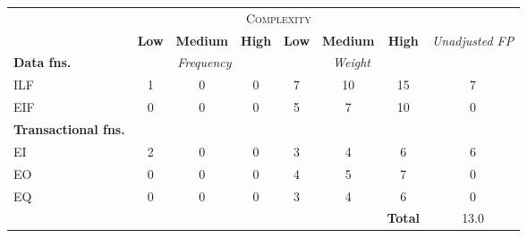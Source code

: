 
\begin{tabular}{|l|c|c|c|c|c|c|c|}
\cline{2-7}
\multicolumn{1}{c}{} & \multicolumn{6}{|c|}{\textsc{Complexity}} & \multicolumn{1}{c}{}  \\ \cline{2-8}
\multicolumn{1}{c|}{} & \textbf{Low} & \textbf{Medium} & \textbf{High} & \textbf{Low} & \textbf{Medium} & \textbf{High} & \multirow{2}{*}{\textit{Unadjusted FP}} \\ \cline{1-7}
\textbf{Data fns.} & \multicolumn{3}{|c|}{\textit{Frequency}} &  \multicolumn{3}{|c|}{\textit{Weight}} & \\ \hline
ILF 	& 1 & 0 & 0 & 7 & 10 & 15 & 7 	\\ \hline
EIF 	& 0 & 0 & 0 & 5 & 7 & 10 & 0		\\ \hline
\textbf{Transactional fns.} & \multicolumn{7}{|c|}{} \\ \hline
EI 		& 2 & 0 & 0 & 3 & 4 & 6 & 6		\\ \hline
EO 		& 0 & 0 & 0 & 4 & 5 & 7 & 0		\\ \hline
EQ		& 0 & 0 & 0 & 3 & 4 & 6 & 0		\\ \hline
\multicolumn{6}{c|}{} & \textbf{Total} & 13.0 \\ \cline{7-8}
\end{tabular}
